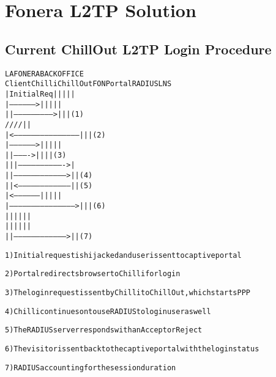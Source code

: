 \section{Fonera L2TP Solution}

\subsection{Current ChillOut L2TP Login Procedure}
\begin{alltt}\small
                        LA FONERA                  BACK OFFICE   
Client             Chilli     ChillOut      FON Portal   RADIUS  LNS
  | Initial Req      |           |               |         |      |
  |----------------->|           |               |         |      |
  |                  |-------------------------->|         |      |   (1)
  /                  /           /               /         |      |   
  |<---------------------------------------------|         |      |   (2)   
  |----------------->|           |               |         |      |
  |                  |---------->|               |         |      |   (3)
  |                  |           |------------------------------->|
  |                  |------------------------------------>|      |   (4)
  |                  |<------------------------------------|      |   (5)
  |<-----------------|           |               |         |      |
  |--------------------------------------------->|         |      |   (6)
  |                  |           |               |         |      |
  |                  |           |               |         |      |
  |                  |------------------------------------>|      |   (7)

1) Initial request is hijacked and user is sent to captive portal

2) Portal redirects browser to Chilli for login

3) The login request is sent by Chilli to ChillOut, which starts PPP

4) Chilli continues on to use RADIUS to login user as well

5) The RADIUS server responds with an Accept or Reject

6) The visitor is sent back to the captive portal with the login status

7) RADIUS accounting for the session duration
\end{alltt}

\newpage
